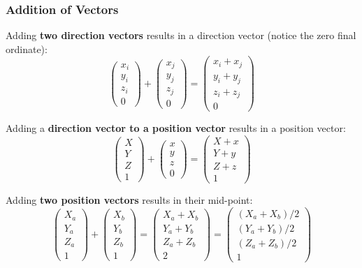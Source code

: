 \documentclass[11pt]{article}
\begin{document}
\subsubsection{Addition of Vectors}
Adding \textbf{two direction vectors} results in a direction vector (notice the zero final ordinate):
\[
  \begin{pmatrix} x_i \\ y_i \\ z_i \\ 0 \end{pmatrix} 
  +
  \begin{pmatrix} x_j \\ y_j \\ z_j \\ 0 \end{pmatrix} 
  =
  \begin{pmatrix} x_i + x_j \\ y_i + y_j \\ z_i + z_j \\ 0 \end{pmatrix} 
\]

Adding a \textbf{direction vector to a position vector} results in a position vector:
\[
  \begin{pmatrix} X \\ Y \\ Z \\ 1 \end{pmatrix} 
  +
  \begin{pmatrix} x \\ y \\ z \\ 0 \end{pmatrix} 
  =
  \begin{pmatrix} X + x \\ Y + y \\ Z + z \\ 1 \end{pmatrix} 
\]

Adding \textbf{two position vectors} results in their mid-point:
\[
  \begin{pmatrix} X_a \\ Y_a \\ Z_a \\ 1 \end{pmatrix} 
  +
  \begin{pmatrix} X_b \\ Y_b \\ Z_b \\ 1 \end{pmatrix} 
  =
  \begin{pmatrix} X_a + X_b \\ Y_a + Y_b \\ Z_a + Z_b \\ 2 \end{pmatrix} 
  =
  \begin{pmatrix} (X_a + X_b) / 2 \\ (Y_a + Y_b) / 2 \\ (Z_a + Z_b) / 2 \\ 1 \end{pmatrix} 
\]
\end{document}
